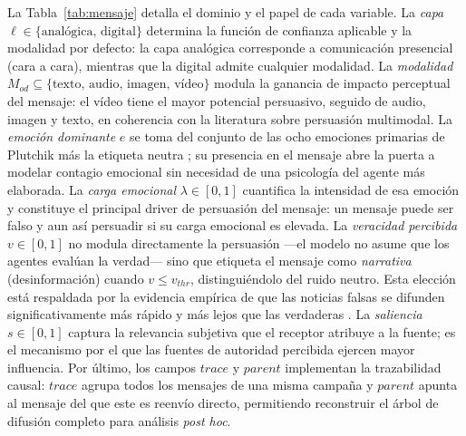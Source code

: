 La Tabla~\ref{tab:mensaje} detalla el dominio y el papel de cada variable.
La \emph{capa} $\ell \in \{\text{analógica},\,\text{digital}\}$ determina la función de confianza aplicable y la modalidad por defecto: la capa analógica corresponde a comunicación presencial (cara a cara), mientras que la digital admite cualquier modalidad.
La \emph{modalidad} $M_{od} \subseteq \{\text{texto},\,\text{audio},\,\text{imagen},\,\text{vídeo}\}$ modula la ganancia de impacto perceptual del mensaje: el vídeo tiene el mayor potencial persuasivo, seguido de audio, imagen y texto, en coherencia con la literatura sobre persuasión multimodal.
La \emph{emoción dominante} $e$ se toma del conjunto de las ocho emociones primarias de Plutchik más la etiqueta neutra \cite{Plutchik1980}; su presencia en el mensaje abre la puerta a modelar contagio emocional sin necesidad de una psicología del agente más elaborada.
La \emph{carga emocional} $\lambda \in [0,1]$ cuantifica la intensidad de esa emoción y constituye el principal driver de persuasión del mensaje: un mensaje puede ser falso y aun así persuadir si su carga emocional es elevada.
La \emph{veracidad percibida} $v \in [0,1]$ no modula directamente la persuasión ---el modelo no asume que los agentes evalúan la verdad--- sino que etiqueta el mensaje como \emph{narrativa} (desinformación) cuando $v \leq v_{thr}$, distinguiéndolo del ruido neutro.
Esta elección está respaldada por la evidencia empírica de que las noticias falsas se difunden significativamente más rápido y más lejos que las verdaderas \cite{Vosoughi2018}.
La \emph{saliencia} $s \in [0,1]$ captura la relevancia subjetiva que el receptor atribuye a la fuente; es el mecanismo por el que las fuentes de autoridad percibida ejercen mayor influencia.
Por último, los campos $trace$ y $parent$ implementan la trazabilidad causal: $trace$ agrupa todos los mensajes de una misma campaña y $parent$ apunta al mensaje del que este es reenvío directo, permitiendo reconstruir el árbol de difusión completo para análisis \emph{post hoc}.

